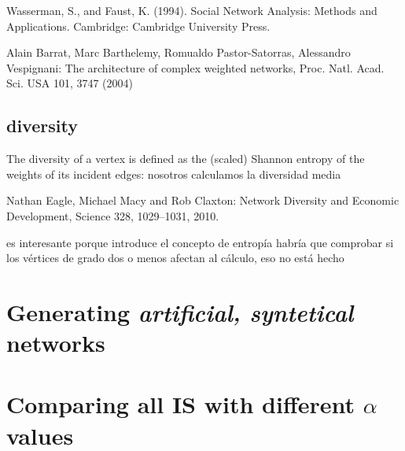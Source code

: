 \documentclass{article}
\begin{document}
Wasserman, S., and Faust, K. (1994). Social Network Analysis: Methods and Applications. Cambridge: Cambridge University Press.

Alain Barrat, Marc Barthelemy, Romualdo Pastor-Satorras, Alessandro Vespignani: The architecture of complex weighted networks, Proc. Natl. Acad. Sci. USA 101, 3747 (2004)



\subsection{diversity}

The diversity of a vertex is defined as the (scaled) Shannon entropy of the weights of its incident edges:
nosotros calculamos la diversidad media

Nathan Eagle, Michael Macy and Rob Claxton: Network Diversity and Economic Development, Science 328, 1029–1031, 2010.

es interesante porque introduce el concepto de entropía
habría que comprobar si los vértices de grado dos o menos afectan al cálculo, eso no está hecho



\section{Generating \emph{artificial, syntetical} networks}

\section{Comparing all IS with different $\alpha$ values}
\label{sec:comparing-all-with}
\end{document}
